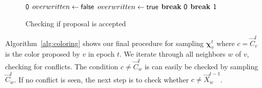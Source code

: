 \begin{figure}[htpb]
\begin{framed}
    \renewcommand\figurename{Algorithm}
    \caption{Checking if proposal is accepted}
    \label{alg:coloring}
    \begin{algorithmic}[1]
             \Comment{\textcolor{Maroon}{Sample the color.}}
                 
                    \State \Return $\mathsf{0}$
                \EndIf
                 \label{alg:line:iterate_backwards}
                     \label{alg:line:check_accepted}
                        \State $overwritten\gets \mathsf{false}$ 
                         \label{alg:line:check_overwritten}
                             \label{alg:line:check_overwritten_recursive}
                                \State $overwritten\gets \mathsf{true}$
                                \State \textbf{break}
                            \EndIf
                        \EndFor
                        \State \Return $\mathsf{0}$  \label{alg:line:conflict}
                        \EndIf
                        \State \textbf{break}
                   \EndIf
                \EndFor
            \EndFor
            \State \Return $\mathsf{1}$  \label{alg:line:no_conflict}
        \EndProcedure
    \end{algorithmic}
\end{framed}
\end{figure}
Algorithm~\ref{alg:coloring} shows our final procedure for sampling $\bm\chi^t_v$ where $c =\vec C^t_v$ is the color proposed by $v$ in epoch $t$.
We iterate through all neighbors $w$ of $v$, checking for conflicts.
The condition $c\not=\vec C^t_w$ is can easily be checked by sampling $\vec C^t_w$.
If no conflict is seen, the next step is to check whether $c\not= \vec X^{t-1}_w$.

